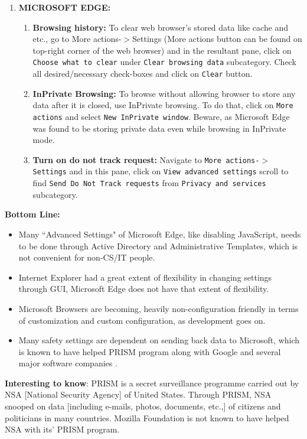 \documentclass[12pt]{extarticle}
\begin{document}
\begin{enumerate}
	\vspace{13mm}
	\noindent
	\item	{\large{\textbf{MICROSOFT EDGE:}}}
	
	\begin{enumerate}
		\item \textbf{Browsing history:} To clear web browser's stored data like cache and etc., go to More actions-$>$Settings (More actions button can be found on top-right corner of the web browser) and in the resultant pane, click on \texttt{Choose what to clear} under \texttt{Clear browsing data} subcategory. Check all desired/necessary check-boxes and click on \texttt{Clear} button.
		
		\item \textbf{InPrivate Browsing:} To browse without allowing browser to store any data after it is closed, use InPrivate browsing. To do that, click on \texttt{More actions} and select \texttt{New InPrivate window}. Beware, as Microsoft Edge was found to be storing private data even while browsing in InPrivate mode.\cite{edgenews} 
		
		\item \textbf{Turn on do not track request:} Navigate to \texttt{More actions-$>$Settings} and in this pane, click on \texttt{View advanced settings} scroll to find \texttt{Send Do Not Track requests} from \texttt{Privacy and services} subcategory.
	\end{enumerate} 
	\end{enumerate}
	
	\vspace{2mm}
	\noindent
	{\textbf{Bottom Line:}}
	\begin{itemize}
		\item Many ``Advanced Settings" of Microsoft Edge, like disabling JavaScript, needs to be done through Active Directory and Administrative Templates, which is not convenient for non-CS/IT people.
		\item Internet Explorer had a great extent of flexibility in changing settings through GUI, Microsoft Edge does not have that extent of flexibility.
		\item Microsoft Browsers are becoming, heavily non-configuration friendly in terms of customization and custom configuration, as development goes on.
		\item Many safety settings are dependent on sending back data to Microsoft, which is known to have helped PRISM program along with Google and several major software companies \cite{PRISM}.
	\end{itemize}
	\textbf{Interesting to know}: PRISM is a secret surveillance programme carried out by NSA [National Security Agency] of United States. Through PRISM, NSA snooped on data [including e-mails, photos, documents, etc.,] of citizens and politicians in many countries. Mozilla Foundation is not known to have helped NSA with its' PRISM program.
	
\end{document}
